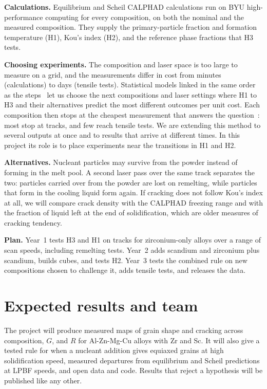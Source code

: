 \documentclass[11pt,letterpaper]{article}
\begin{document}
\textbf{Calculations.} Equilibrium and Scheil CALPHAD calculations run on BYU
high-performance computing for every composition, on both the nominal and the
measured composition. They supply the primary-particle fraction and formation
temperature (H1), Kou's index (H2), and the reference phase fractions that H3
tests.

\textbf{Choosing experiments.} The composition and laser space is too large
to measure on a grid, and the measurements differ in cost from minutes
(calculations) to days (tensile tests). Statistical models linked in the same
order as the steps~\cite{astudillo2021} let us choose the next compositions
and laser settings where H1 to H3 and their alternatives predict the most
different outcomes per unit cost. Each composition then stops at the cheapest
measurement that answers the question~\cite{buathong2024}: most stop at
tracks, and few reach tensile tests. We are extending this method to several
outputs at once and to results that arrive at different times. In this
project its role is to place experiments near the transitions in H1 and H2.

\textbf{Alternatives.} Nucleant particles may survive from the powder
instead of forming in the melt pool. A second laser pass over the same
track separates the two: particles carried over from the powder are lost on
remelting, while particles that form in the cooling liquid form again. If
cracking does not follow Kou's index at all, we will compare crack density
with the CALPHAD freezing range and with the fraction of liquid left at the
end of solidification, which are older measures of cracking tendency.

\textbf{Plan.} Year~1 tests H3 and H1 on tracks for zirconium-only alloys
over a range of scan speeds, including remelting tests. Year~2 adds scandium
and zirconium plus scandium, builds cubes, and tests H2. Year~3 tests the
combined rule on new compositions chosen to challenge it, adds tensile tests,
and releases the data.

\section{Expected results and team}

The project will produce measured maps of grain shape and cracking across
composition, $G$, and $R$ for Al-Zn-Mg-Cu alloys with Zr and Sc. It will also
give a tested rule for when a nucleant addition gives equiaxed grains at high
solidification speed, measured departures from equilibrium and Scheil
predictions at LPBF speeds, and open data and code. Results that reject a
hypothesis will be published like any other.
\end{document}
